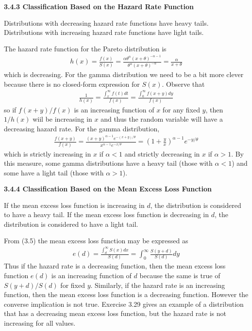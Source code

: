 \documentclass[hidelinks, 12pt]{article}
\theoremstyle{mydefstyle}
\theoremstyle{mythmstyle}
\begin{document}
\textbf{3.4.3 Classification Based on the Hazard Rate Function}

Distributions with decreasing hazard rate functions have heavy tails. Distributions with increasing hazard rate functions have light tails. 

The hazard rate function for the Pareto distribution is
\begin{gather*}
h(x) = \frac{f(x)}{S(x)} = \frac{\alpha \theta^{\alpha} (x+\theta)^{-\alpha-1}}{\theta^{\alpha} (x+\theta)^{-\alpha}} = \frac{\alpha}{x+\theta}
\end{gather*}
which is decreasing. For the gamma distribution we need to be a bit more clever because there is no closed-form expression for $S(x)$. Observe that
\begin{gather*}
\frac{1}{h(x)} = \frac{\int_x^{\infty} f(t) dt}{f(x)} = \frac{\int_0^{\infty} f(x+y) dy}{f(x)}
\end{gather*}
so if $f(x+y) / f(x)$ is an increasing function of $x$ for any fixed $y$, then $1/h(x)$ wiil be increasing in $x$ and thus the random variable will have a decreasing hazard rate. For the gamma distribution, 
\begin{gather*}
\frac{f(x+y)}{f(x)} = \frac{(x+y)^{\alpha-1} e^{-(x+y)/\theta}}{x^{\alpha-1} e^{-x/\theta}} = \left(1+\frac{y}{x}\right)^{\alpha-1} e^{-y/\theta}
\end{gather*}
which is strictly increasing in $x$ if $\alpha < 1$ and strictly decreasing in $x$ if $\alpha > 1$. By this measure, some gamma distributions have a heavy tail (those with $\alpha < 1$) and some have a light tail (those with $\alpha > 1$). 

\textbf{3.4.4 Classification Based on the Mean Excess Loss Function}

If the mean excess loss function is increasing in $d$, the distribution is considered to have a heavy tail. If the mean excess loss function is decreasing in $d$, the distribution is considered to have a light tail. 

From (3.5) the mean excess loss function may be expressed as
\begin{gather*}
e(d) = \frac{\int_d^{\infty} S(x) dx}{S(d)} = \int_0^{\infty} \frac{S(y+d)}{S(d)} dy
\end{gather*}
Thus if the hazard rate is a decreasing function, then the mean excess loss function $e(d)$ is an increasing function of $d$ because the same is true of $S(y+d)/S(d)$ for fixed $y$. Similarly, if the hazard rate is an increasing function, then the mean excess loss function is a decreasing function. However the converse implication is not true. Exercise 3.29 gives an example of a distribution that has a decreasing mean excess loss function, but the hazard rate is not increasing for all values. 
\end{document}
